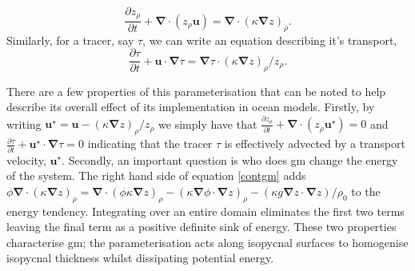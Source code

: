 \documentclass[10pt,a4paper]{article}
\begin{document}
          \begin{equation}
          \frac{\partial z_{\rho}}{\partial t} + \boldsymbol{\nabla}\cdot\left(z_{\rho}\boldsymbol{u}\right) = \boldsymbol{\nabla}\cdot\left(\kappa
              \boldsymbol{\nabla} z \right)_{\rho} .
              \label{contgm}
          \end{equation}
    Similarly, for a tracer, say $\tau$, we can write an equation
    describing it's transport,
            \begin{equation}
              \frac{\partial \tau}{\partial t} + \boldsymbol{u}\cdot\boldsymbol{\nabla}\tau = \boldsymbol{\nabla}\tau\cdot
              \left(\kappa \boldsymbol{\nabla} z \right)_{\rho}/z_{\rho} .
            \end{equation}
            
    There are a few properties of this parameterisation that can be 
    noted to help describe its overall effect of its implementation in
    ocean models. Firstly, by writing $\boldsymbol{u}^{\star} = \boldsymbol{u} -
    \left(\kappa \boldsymbol{\nabla} z \right)_{\rho}/z_{\rho}$ we 
    simply have that $\frac{\partial z_{\rho}}{\partial t} + \boldsymbol{\nabla}\cdot\left(z_{\rho}\boldsymbol{u}^{\star}\right) = 0$ and $\frac{\partial \tau}{\partial t} + \boldsymbol{u}^{\star}\cdot\boldsymbol{\nabla}\tau = 0$ indicating
    that the tracer $\tau$ is effectively advected by a transport velocity, 
     $\boldsymbol{u}^{\star}$. Secondly, an important 
    question is who does \gls{gm} change the energy of the system. 
    The right hand side of equation \ref{contgm} adds 
    $\phi \boldsymbol{\nabla}\cdot\left(\kappa
                  \boldsymbol{\nabla} z \right)_{\rho} 
                  = \boldsymbol{\nabla}\cdot\left(\phi\kappa
                       \boldsymbol{\nabla} z \right)_{\rho} 
                  -\left(\kappa
              \boldsymbol{\nabla}\phi\cdot \boldsymbol{\nabla} z \right)_{\rho} 
                                -\left(\kappa g
                            \boldsymbol{\nabla}z\cdot \boldsymbol{\nabla} z \right)/{\rho_{0}} 
                $ to the energy tendency. Integrating over an entire domain
                eliminates the first two terms leaving the final term
                as a positive definite sink of energy. These two 
                properties characterise \gls{gm}; the parameterisation
                acts along isopycnal surfaces to homogenise isopycnal 
                thickness whilst dissipating potential energy.
                
\end{document}
